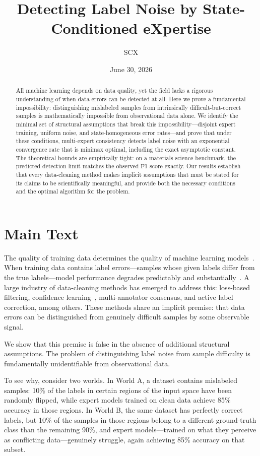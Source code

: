 \documentclass[12pt,a4paper]{article}
\title{Detecting Label Noise by State-Conditioned eXpertise}
\author{SCX}
\date{June 30, 2026}
\theoremstyle{definition}
\theoremstyle{plain}
\theoremstyle{remark}
\begin{document}
\maketitle

\begin{abstract}
All machine learning depends on data quality, yet the field lacks a rigorous understanding of when data errors can be detected at all. Here we prove a fundamental impossibility: distinguishing mislabeled samples from intrinsically difficult-but-correct samples is mathematically impossible from observational data alone. We identify the minimal set of structural assumptions that break this impossibility---disjoint expert training, uniform noise, and state-homogeneous error rates---and prove that under these conditions, multi-expert consistency detects label noise with an exponential convergence rate that is minimax optimal, including the exact asymptotic constant. The theoretical bounds are empirically tight: on a materials science benchmark, the predicted detection limit matches the observed F1 score exactly. Our results establish that every data-cleaning method makes implicit assumptions that must be stated for its claims to be scientifically meaningful, and provide both the necessary conditions and the optimal algorithm for the problem.
\end{abstract}

\section{Main Text}

The quality of training data determines the quality of machine learning models~\cite{sambasivan2021}. When training data contains label errors---samples whose given labels differ from the true labels---model performance degrades predictably and substantially~\cite{northcutt2021}. A large industry of data-cleaning methods has emerged to address this: loss-based filtering, confidence learning~\cite{northcutt2021}, multi-annotator consensus, and active label correction, among others. These methods share an implicit premise: that data errors can be distinguished from genuinely difficult samples by some observable signal.

We show that this premise is false in the absence of additional structural assumptions. The problem of distinguishing label noise from sample difficulty is fundamentally unidentifiable from observational data.

To see why, consider two worlds. In World A, a dataset contains mislabeled samples: 10\% of the labels in certain regions of the input space have been randomly flipped, while expert models trained on clean data achieve 85\% accuracy in those regions. In World B, the same dataset has perfectly correct labels, but 10\% of the samples in those regions belong to a different ground-truth class than the remaining 90\%, and expert models---trained on what they perceive as conflicting data---genuinely struggle, again achieving 85\% accuracy on that subset.
\end{document}
